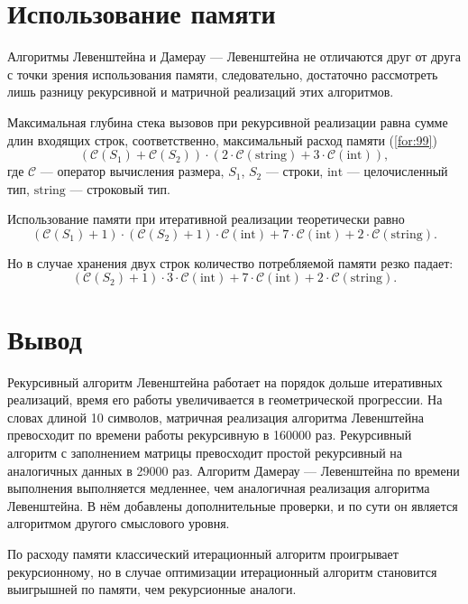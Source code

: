 \section{Использование памяти}

Алгоритмы Левенштейна и Дамерау — Левенштейна не отличаются друг от друга с точки зрения использования памяти, следовательно, достаточно рассмотреть лишь разницу рекурсивной и матричной реализаций этих алгоритмов.

Максимальная глубина стека вызовов при рекурсивной реализации равна сумме длин входящих строк, соответственно, максимальный расход памяти (\ref{for:99})
\begin{equation}
(\mathcal{C}(S_1) + \mathcal{C}(S_2)) \cdot (2 \cdot \mathcal{C}\mathrm{(string)} + 3 \cdot \mathcal{C}\mathrm{(int)}),
\label{for:99}
\end{equation}
где $\mathcal{C}$ — оператор вычисления размера, $S_1$, $S_2$ — строки, $\mathrm{int}$ — целочисленный тип, $\mathrm{string}$ — строковый тип.

Использование памяти при итеративной реализации теоретически равно
\begin{equation}
(\mathcal{C}(S_1) + 1) \cdot (\mathcal{C}(S_2) + 1) \cdot \mathcal{C}\mathrm{(int)} + 7\cdot \mathcal{C}\mathrm{(int)} + 2 \cdot \mathcal{C}\mathrm{(string)}.
\end{equation}

Но в случае хранения двух строк количество потребляемой памяти резко падает:
\begin{equation}
(\mathcal{C}(S_2) + 1) \cdot 3 \cdot \mathcal{C}\mathrm{(int)} + 7\cdot \mathcal{C}\mathrm{(int)} + 2 \cdot \mathcal{C}\mathrm{(string)}.
\end{equation}


\section{Вывод}

Рекурсивный алгоритм Левенштейна работает на порядок дольше итеративных реализаций, время его работы увеличивается в геометрической прогрессии. 
На словах длиной 10 символов, матричная реализация алгоритма Левенштейна превосходит по времени работы рекурсивную в 160000 раз. 
Рекурсивный алгоритм с заполнением матрицы превосходит простой рекурсивный на аналогичных данных в 29000 раз. 
Алгоритм Дамерау — Левенштейна по времени выполнения выполняется медленнее, чем аналогичная реализация алгоритма Левенштейна. 
В нём добавлены дополнительные проверки, и по сути он является алгоритмом другого смыслового уровня.

По расходу памяти классический итерационный алгоритм проигрывает рекурсионному, но в случае оптимизации итерационный алгоритм становится выигрышней по памяти, чем рекурсионные аналоги.